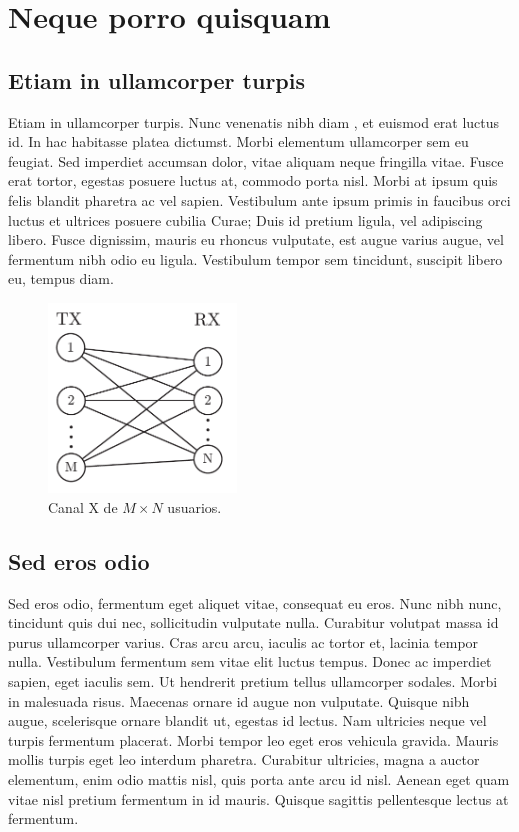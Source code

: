 \chapter{Neque porro quisquam}

\section{Etiam in ullamcorper turpis}

Etiam in ullamcorper turpis. Nunc venenatis nibh diam \cite{doe2016}, et euismod erat luctus id. In hac habitasse platea dictumst. Morbi elementum ullamcorper sem eu feugiat. Sed imperdiet accumsan dolor, vitae aliquam neque fringilla vitae. Fusce erat tortor, egestas posuere luctus at, commodo porta nisl. Morbi at ipsum quis felis blandit pharetra ac vel sapien. Vestibulum ante ipsum primis in faucibus orci luctus et ultrices posuere cubilia Curae; Duis id pretium ligula, vel adipiscing libero. Fusce dignissim, mauris eu rhoncus vulputate, est augue varius augue, vel fermentum nibh odio eu ligula. Vestibulum tempor sem tincidunt, suscipit libero eu, tempus diam.

\begin{figure}[h!]
    \begin{center}
        \includegraphics[width=5cm]{content/fig/chap1/X_channel_MxN}
    \end{center}
   \caption{Canal X de $M\times N$ usuarios.}
  \label{fig:X_channel_MxN}
\end{figure}

\section{Sed eros odio}

Sed eros odio, fermentum eget aliquet vitae, consequat eu eros. Nunc nibh nunc, tincidunt quis dui nec, sollicitudin vulputate nulla. Curabitur volutpat massa id purus ullamcorper varius. Cras arcu arcu, iaculis ac tortor et, lacinia tempor nulla. Vestibulum fermentum sem vitae elit luctus tempus. Donec ac imperdiet sapien, eget iaculis sem. Ut hendrerit pretium tellus ullamcorper sodales. Morbi in malesuada risus. Maecenas ornare id augue non vulputate. Quisque nibh augue, scelerisque ornare blandit ut, egestas id lectus. Nam ultricies neque vel turpis fermentum placerat. Morbi tempor leo eget eros vehicula gravida. Mauris mollis turpis eget leo interdum pharetra. Curabitur ultricies, magna a auctor elementum, enim odio mattis nisl, quis porta ante arcu id nisl. Aenean eget quam vitae nisl pretium fermentum in id mauris. Quisque sagittis pellentesque lectus at fermentum.

